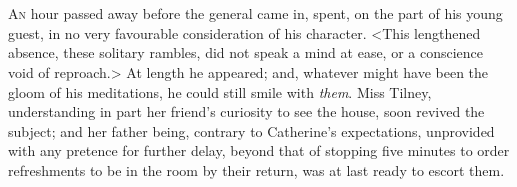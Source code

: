 \chapter[Chapter \thechapter]{} 

\lettrine{A}{n} hour passed away before the general came in, spent, on the part of his young guest, in no very favourable consideration of his character. <This lengthened absence, these solitary rambles, did not speak a mind at ease, or a conscience void of reproach.> At length he appeared; and, whatever might have been the gloom of his meditations, he could still smile with \textit{them}. Miss Tilney, understanding in part her friend's curiosity to see the house, soon revived the subject; and her father being, contrary to Catherine's expectations, unprovided with any pretence for further delay, beyond that of stopping five minutes to order refreshments to be in the room by their return, was at last ready to escort them. 

